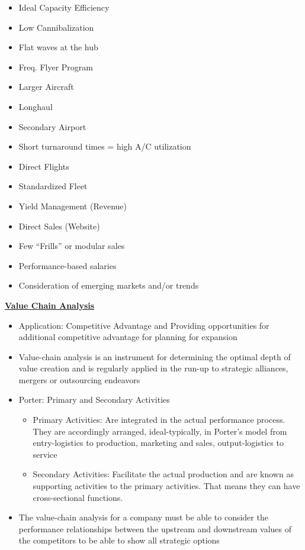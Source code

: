 \documentclass[9pt, landscape, fleqn]{scrartcl}
\begin{document}
\begin{multicols*}{3}
\begin{itemize}
    \item Ideal Capacity Efficiency
    \item Low Cannibalization 
    \item Flat waves at the hub 
    \item Freq. Flyer Program 
    \item Larger Aircraft 
    \item Longhaul 
    \item Secondary Airport 
    \item Short turnaround times = high A/C utilization 
    \item Direct Flights 
    \item Standardized Fleet 
    \item Yield Management (Revenue)
    \item Direct Sales (Website)
    \item Few ``Frills'' or modular sales 
    \item Performance-based salaries 
    \item Consideration of emerging markets and/or trends
\end{itemize}
\underline{\textbf{Value Chain Analysis}}
\begin{itemize}
    \item Application: Competitive Advantage and Providing opportunities for additional competitive advantage for planning for expansion 
    \item Value-chain analysis is an instrument for determining the optimal depth of value creation and is regularly applied in the run-up to strategic alliances, mergers or outsourcing endeavors
    \item Porter: Primary and Secondary Activities
    \begin{itemize}
        \item Primary Activities: Are integrated in the actual performance process. They are accordingly arranged, ideal-typically, in Porter's model from entry-logistics to production, marketing and sales, output-logistics to service
        \item Secondary Activities: Facilitate the actual production and are known as supporting activities to the primary activities. That means they can have cross-sectional functions.
    \end{itemize}
    \item The value-chain analysis for a company must be able to consider the performance relationships between the upstream and downstream values of the competitors to be able to show all strategic options

\end{itemize}
\end{multicols*}
\end{document}
